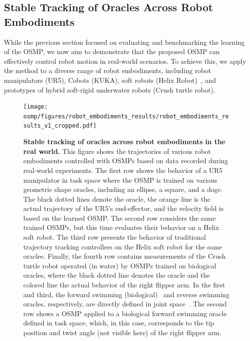 \subsection{Stable Tracking of Oracles Across Robot Embodiments}

While the previous section focused on evaluating and benchmarking the learning of the \gls{OSMP}, we now aim to demonstrate that the proposed \gls{OSMP} can effectively control robot motion in real-world scenarios. To achieve this, we apply the method to a diverse range of robot embodiments, including robot manipulators (UR5), \glspl{Cobot} (KUKA), soft robots (Helix Robot)~\citep{guan2023trimmed}, and prototypes of hybrid soft-rigid underwater robots (Crush turtle robot).

\begin{figure}[h!]
    \centering
    \texttt{[image: osmp/figures/robot\_embodiments\_results/robot\_embodiments\_results\_v1\_cropped.pdf]}
    \caption{\textbf{Stable tracking of oracles across robot embodiments in the real world.}
    This figure shows the trajectories of various robot embodiments controlled with \glspl{OSMP} based on data recorded during real-world experiments.
    The first row shows the behavior of a UR5 manipulator in task space where the \gls{OSMP} is trained on various geometric shape oracles, including an ellipse, a square, and a doge. The black dotted lines denote the oracle, the orange line is the actual trajectory of the UR5's end-effector, and the velocity field is based on the learned \gls{OSMP}.
    The second row considers the same trained \glspl{OSMP}, but this time evaluates their behavior on a Helix soft robot.
    The third row presents the behavior of traditional trajectory tracking controllers on the Helix soft robot for the same oracles.
    Finally, the fourth row contains measurements of the Crush turtle robot operated (in water) by \glspl{OSMP} trained on biological oracles, where the black dotted line denotes the oracle and the colored line the actual behavior of the right flipper arm. In the first and third, the forward swimming (biological)~\citep{van2022new} and reverse swimming oracles, respectively, are directly defined in joint space~\citep{van2023soft}. The second row shows a \gls{OSMP} applied to a biological forward swimming oracle defined in task space, which, in this case, corresponds to the tip position and twist angle (not visible here) of the right flipper arm.
    }
    \label{fig:osmp:robot_embodiments_results}
\end{figure}


